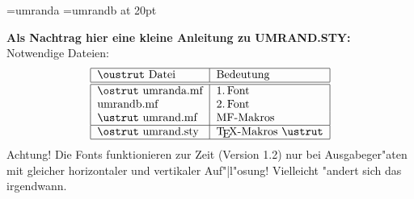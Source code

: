 

\def\C{\char'}
\font\UA=umranda
\font\UB=umrandb at 20pt

\def\make{%
    \begin{flushleft}
        \begin{minipage}[c]{0.58\linewidth}
            
        \end{minipage}
        \hfill\vrule\hfill
        \begin{minipage}[c]{0.38\linewidth}
            
        \end{minipage}
    \end{flushleft}}


{\bf Als Nachtrag hier eine kleine Anleitung zu UMRAND.STY:}\\[3mm]
Notwendige Dateien:
\[ \begin{tabular}{|l|l|}
   \hline
   \oustrut Datei & Bedeutung \\ \hline\hline
   \ostrut umranda.mf & 1.\,Font \\
           umrandb.mf & 2.\,Font \\
   \ustrut umrand.mf  & MF-Makros \\ \hline
   \ostrut umrand.sty & \TeX-Makros
   \ustrut \\ \hline
   \end{tabular} \]
Achtung! Die Fonts funktionieren zur Zeit (Version 1.2) nur bei
Ausgabeger"aten mit gleicher horizontaler und vertikaler Auf"|l"osung!
Vielleicht "andert sich das irgendwann.

